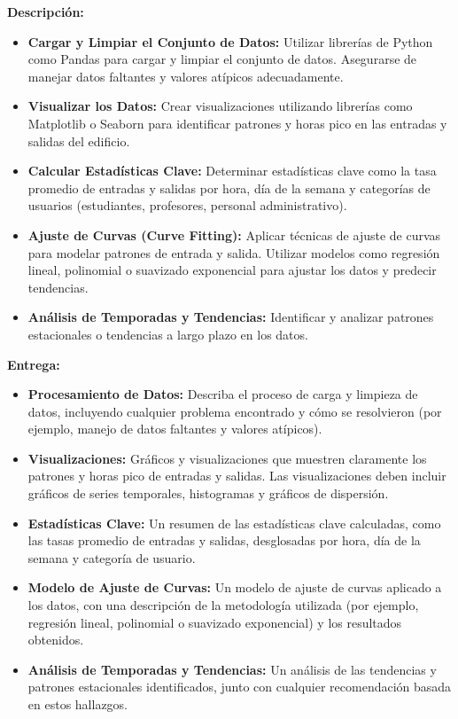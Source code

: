 \documentclass[12pt]{article}
\begin{document}
\textbf{Descripción:}
\begin{itemize}
    \item \textbf{Cargar y Limpiar el Conjunto de Datos:} Utilizar librerías de Python como Pandas para cargar y limpiar el conjunto de datos. Asegurarse de manejar datos faltantes y valores atípicos adecuadamente.
    \item \textbf{Visualizar los Datos:} Crear visualizaciones utilizando librerías como Matplotlib o Seaborn para identificar patrones y horas pico en las entradas y salidas del edificio.
    \item \textbf{Calcular Estadísticas Clave:} Determinar estadísticas clave como la tasa promedio de entradas y salidas por hora, día de la semana y categorías de usuarios (estudiantes, profesores, personal administrativo).
    \item \textbf{Ajuste de Curvas (Curve Fitting):} Aplicar técnicas de ajuste de curvas para modelar patrones de entrada y salida. Utilizar modelos como regresión lineal, polinomial o suavizado exponencial para ajustar los datos y predecir tendencias.
    \item \textbf{Análisis de Temporadas y Tendencias:} Identificar y analizar patrones estacionales o tendencias a largo plazo en los datos.
\end{itemize}
\textbf{Entrega:}
\begin{itemize}
    \item \textbf{Procesamiento de Datos:} Describa el proceso de carga y limpieza de datos, incluyendo cualquier problema encontrado y cómo se resolvieron (por ejemplo, manejo de datos faltantes y valores atípicos).
    \item \textbf{Visualizaciones:} Gráficos y visualizaciones que muestren claramente los patrones y horas pico de entradas y salidas. Las visualizaciones deben incluir gráficos de series temporales, histogramas y gráficos de dispersión.
    \item \textbf{Estadísticas Clave:} Un resumen de las estadísticas clave calculadas, como las tasas promedio de entradas y salidas, desglosadas por hora, día de la semana y categoría de usuario.
    \item \textbf{Modelo de Ajuste de Curvas:} Un modelo de ajuste de curvas aplicado a los datos, con una descripción de la metodología utilizada (por ejemplo, regresión lineal, polinomial o suavizado exponencial) y los resultados obtenidos.
    \item \textbf{Análisis de Temporadas y Tendencias:} Un análisis de las tendencias y patrones estacionales identificados, junto con cualquier recomendación basada en estos hallazgos.
\end{itemize}
\end{document}
